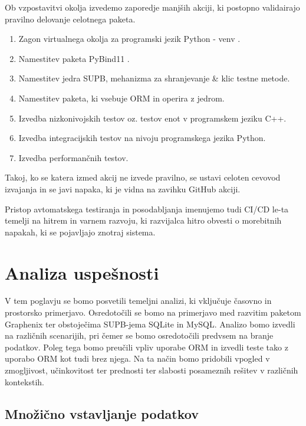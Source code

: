\documentclass[a4paper,12pt,openright]{book}
\begin{document}
   Ob vzpostavitvi okolja izvedemo zaporedje manjših akciji, ki postopno validairajo pravilno delovanje celotnega paketa.
   \begin{enumerate}
       \item Zagon virtualnega okolja za programski jezik Python - venv \cite{wang2022smartpip}.
       \item Namestitev paketa PyBind11 \cite{PYBIND11_GITHUB}.
       \item Namestitev jedra SUPB, mehanizma za shranjevanje \& klic testne metode.
       \item Namestitev paketa, ki vsebuje ORM in operira z jedrom.
       \item Izvedba nizkonivojskih testov oz. testov enot v programskem jeziku C++.
       \item Izvedba integracijskih testov na nivoju programskega jezika Python.
       \item Izvedba performančnih testov.
   \end{enumerate}

    \noindent
   Takoj, ko se katera izmed akcij ne izvede pravilno, se ustavi celoten cevovod izvajanja in se javi napaka, ki je vidna na zavihku GitHub akciji.

   Pristop avtomatskega testiranja in posodabljanja imenujemo tudi CI/CD le-ta temelji na hitrem in varnem razvoju, ki razvijalca hitro obvesti o morebitnih napakah, ki se pojavljajo znotraj sistema.
    
\chapter{Analiza uspešnosti}
\label{ch2}

    V tem poglavju se bomo posvetili temeljni analizi, ki vključuje časovno in prostorsko primerjavo. Osredotočili se bomo na primerjavo med razvitim paketom Graphenix ter obstoječima SUPB-jema SQLite in MySQL. Analizo bomo izvedli na različnih scenarijih, pri čemer se bomo osredotočili predvsem na branje podatkov. Poleg tega bomo preučili vpliv uporabe ORM in izvedli teste tako z uporabo ORM kot tudi brez njega. Na ta način bomo pridobili vpogled v zmogljivost, učinkovitost ter prednosti ter slabosti posameznih rešitev v različnih kontekstih.

    \newpage
   \section{Množično vstavljanje podatkov}
\end{document}
